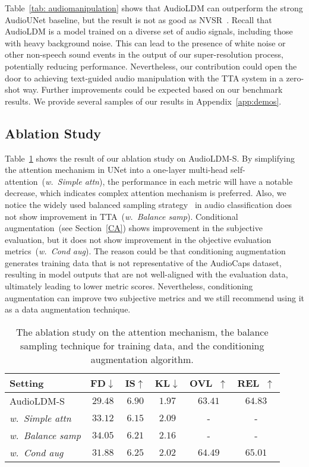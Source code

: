 Table~\ref{tab: audiomanipulation} shows that AudioLDM can outperform the strong AudioUNet baseline, but the result is not as good as NVSR~\cite{liu2022neural}. 
Recall that AudioLDM is a model trained on a diverse set of audio signals, including those with heavy background noise. This can lead to the presence of white noise or other non-speech sound events in the output of our super-resolution process, potentially reducing performance. 
Nevertheless, our contribution could open the door to achieving text-guided audio manipulation with the TTA system in a zero-shot way. Further improvements could be expected based on our benchmark results. We provide several samples of our results in Appendix~\ref{app:demos}. 

\subsection{Ablation Study}

Table~\ref{tab: ablationstudy} shows the result of our ablation study on AudioLDM-S. By simplifying the attention mechanism in UNet into a one-layer multi-head self-attention~(\textit{w.~Simple attn}), the performance in each metric will have a notable decrease, which indicates complex attention mechanism is preferred. Also, we notice the widely used balanced sampling strategy~\cite{gong2021psla, liu2022ontology} in audio classification does not show improvement in TTA~(\textit{w.~Balance samp}). Conditional augmentation~(see Section~\ref{CA}) shows improvement in the subjective evaluation, but it does not show improvement in the objective evaluation metrics~(\textit{w.~Cond aug}). 
The reason could be that conditioning augmentation generates training data that is not representative of the AudioCaps dataset, resulting in model outputs that are not well-aligned with the evaluation data, ultimately leading to lower metric scores. Nevertheless, conditioning augmentation can improve two subjective metrics and we still recommend using it as a data augmentation technique.

\begin{table}[htbp]
\small
\centering
\begin{tabular}{lccc|cc}
\toprule
       Setting            & FD$\downarrow$   & IS$\uparrow$   & KL$\downarrow$  & OVL~$\uparrow$ & REL~$\uparrow$ \\
\midrule
AudioLDM-S      & $\mathbf{29.48}$ & $\mathbf{6.90}$ & $\mathbf{1.97}$ & $63.41$ & $64.83$ \\
\textit{w.~Simple attn}             & $33.12$ & $6.15$ & $2.09$ & - & - \\
\textit{w.~Balance samp} &  $34.05$     &   $6.21$   &  $2.16$   & - & - \\
\textit{w.~Cond aug}           & $31.88$ & $6.25$ & $2.02$ & $\mathbf{64.49}$ & $\mathbf{65.01}$  \\
\bottomrule
\end{tabular}
\caption{The ablation study on the attention mechanism, the balance sampling technique for training data, and the conditioning augmentation algorithm.}
\label{tab: ablationstudy}
\end{table}

